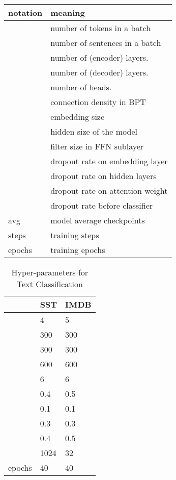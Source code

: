 \documentclass[11pt,a4paper]{article}
\begin{document}
\begin{table}[!htb]
\begin{tabular}{ll}
\toprule
notation & meaning                                          \\
\midrule
          & number of tokens in a batch                      \\
   & number of sentences in a batch \\
          & number of (encoder) layers.                  \\
          & number of (decoder) layers.                  \\
          & number of heads.                                 \\
          & connection density in BPT                        \\
    & embedding size                                   \\
          & hidden size of the model                         \\
     & filter size in FFN sublayer                      \\
        & dropout rate on embedding layer                  \\
        & dropout rate on hidden layers                    \\
        & dropout rate on attention weight                 \\
        & dropout rate before classifier \\
avg          & model average checkpoints              \\
steps & training steps                           \\
epochs & training epochs \\
\bottomrule
\end{tabular}
\end{table}

\begin{table}[!htb]
\centering
\begin{tabular}{lll}
\toprule
          & SST & IMDB \\
\midrule
       & 4   & 5    \\
 & 300 & 300  \\
       & 300 & 300  \\
  & 600 & 600  \\
       & 6   & 6    \\
     & 0.4 & 0.5  \\
     & 0.1 & 0.1  \\
     & 0.3 & 0.3  \\
     & 0.4 & 0.5  \\
       & 1024 & 32  \\
epochs    & 40  & 40   \\
\bottomrule
\end{tabular}
\caption{Hyper-parameters for Text Classification}
\label{tbl:hyper-tc}
\end{table}
\end{document}
